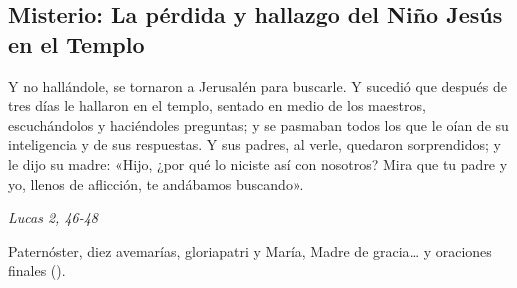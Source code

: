 \documentclass[./rosary.tex]{subfiles}
\newcounter{joyful-counter}
\begin{document}
\bigskip

\subsection*{ Misterio: La pérdida y hallazgo del Niño Jesús en el Templo}

Y no hallándole, se tornaron a Jerusalén para buscarle. Y sucedió que después de tres días le hallaron en el templo,
sentado en medio de los maestros, escuchándolos y haciéndoles preguntas; y se pasmaban todos los que le oían de su
inteligencia y de sus respuestas. Y sus padres, al verle, quedaron sorprendidos; y le dijo su madre:
«Hijo, ¿por qué lo niciste así con nosotros? Mira que tu padre y yo, llenos de aflicción, te andábamos buscando».
\begin{flushright}
      \emph{Lucas 2, 46-48}
\end{flushright}

Paternóster, diez avemarías, gloriapatri y María, Madre de gracia{\ldots} y oraciones finales ().
\end{document}
